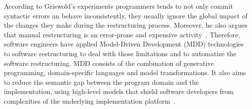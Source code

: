 According to Griswold's experiments programmers tends to not only commit syntactic errors an behave inconsistently, they usually ignore the global impact of the changes they make during the restructuring process. Moreover, he also argues that manual restructuring is an error-prone and expensive activity~\cite{grisswold}. Therefore, software engineers have applied Model-Driven Development (MDD) technologies to software restructuring to deal with those limitations and to automatize the software restructuring. MDD consists of the combination of generative programming, domain-specific languages and model transformations. It also aims to reduce the semantic gap between the program domain and the implementation, using high-level models that shield software developers from complexities of the underlying implementation platform~\cite{France:2007:MDC:1253532.1254709}.